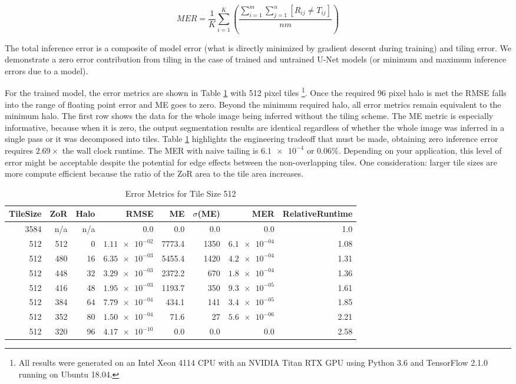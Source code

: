 \documentclass[10pt, indentfirst]{article}
\begin{document}
\begin{equation}
MER = \frac{1}{K} \sum_{i=1}^{K} \left( \frac{\sum_{i = 1}^{m} \sum_{j = 1}^{n} [ R_{ij} \neq T_{ij} ]}{nm} \right) 
\label{eq:mer}
\end{equation}

The total inference error is a composite of model error (what is directly minimized by gradient descent during training) and tiling error.
We demonstrate a zero error contribution from tiling in the case of trained and untrained U-Net models (or minimum and maximum inference errors due to a model).

For the trained model, the error metrics are shown in Table \ref{tab:tile_size_512} with 512 pixel tiles \footnote{All results were generated on an Intel Xeon 4114 CPU with an NVIDIA Titan RTX GPU using Python 3.6 and TensorFlow 2.1.0 running on Ubuntu 18.04.}.
Once the required 96 pixel halo is met the RMSE falls into the range of floating point error and ME goes to zero.
Beyond the minimum required halo, all error metrics remain equivalent to the minimum halo.
The first row shows the data for the whole image being inferred without the tiling scheme.
The ME metric is especially informative, because when it is zero, the output segmentation results are identical regardless of whether the whole image was inferred in a single pass or it was decomposed into tiles.
Table \ref{tab:tile_size_512} highlights the engineering tradeoff that must be made, obtaining zero inference error requires $2.69 \times$ the wall clock runtime.
The MER with naive tailing is $\num{6.1e-4}$ or $\num{0.06} \%$.
Depending on your application, this level of error might be acceptable despite the potential for edge effects between the non-overlapping tiles.
One consideration: larger tile sizes are more compute efficient because the ratio of the ZoR area to the tile area increases.

\begin{table}
	\centering
	\caption{Error Metrics for Tile Size 512}
	\label{tab:tile_size_512}
	\begin{tabular}{r|r|r|r|r|r|r|r}
		TileSize & ZoR & Halo & RMSE    & ME & $\sigma$(ME) & MER & RelativeRuntime \\ 
		\hline
		3584 & n/a & n/a & 0.0 & 0.0 & 0.0 & 0.0 & 1.0 \\
		512 & 512 & 0 & $\num{1.11e-02}$ & 7773.4 & 1350 & $\num{6.1e-04}$ & 1.08 \\
		512 & 480 & 16 & $\num{6.35e-03}$ & 5455.4 & 1420 & $\num{4.2e-04}$ & 1.31 \\
		512 & 448 & 32 & $\num{3.29e-03}$ & 2372.2 & 670 & $\num{1.8e-04}$ & 1.36 \\
		512 & 416 & 48 & $\num{1.95e-03}$ & 1193.7 & 350 & $\num{9.3e-05}$ & 1.61 \\
		512 & 384 & 64 & $\num{7.79e-04}$ & 434.1 & 141 &$\num{3.4e-05}$ & 1.85 \\
		512 & 352 & 80 & $\num{1.50e-04}$ & 71.6 & 27 & $\num{5.6e-06}$ & 2.21 \\
		512 & 320 & 96 & $\num{4.17e-10}$ & 0.0 & 0.0 & 0.0 & 2.58 \\
	\end{tabular}
\end{table}
\end{document}
